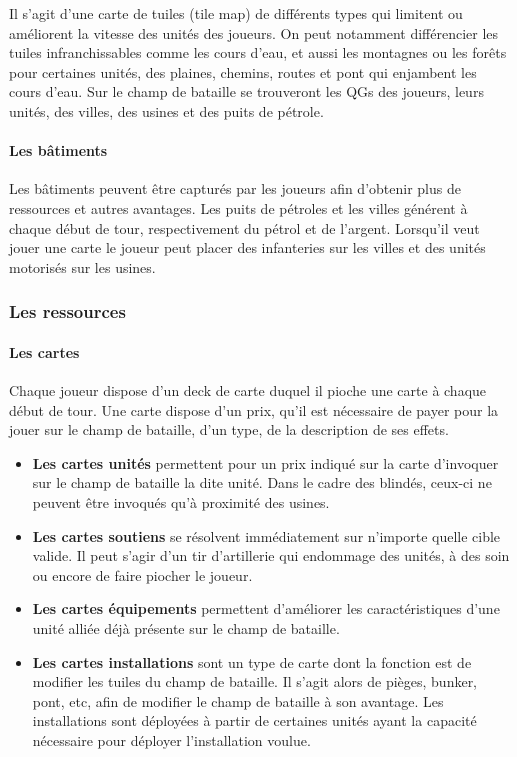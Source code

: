 Il s'agit d'une carte de tuiles (tile map) de différents types qui limitent ou améliorent la vitesse des unités des joueurs.
On peut notamment différencier les tuiles infranchissables comme les cours d'eau, et aussi les montagnes ou les forêts pour certaines unités, des plaines, chemins, routes et pont qui enjambent les cours d'eau.
Sur le champ de bataille se trouveront les QGs des joueurs, leurs unités, des villes, des usines et des puits de pétrole.



\paragraph{Les bâtiments}

Les bâtiments peuvent être capturés par les joueurs afin d'obtenir plus de ressources et autres avantages. Les puits de pétroles et les villes générent à chaque début de tour, respectivement du pétrol et de l'argent. Lorsqu'il veut jouer une carte le joueur peut placer des infanteries sur les villes et des unités motorisés sur les usines.



\subsubsection{Les ressources}

\paragraph{Les cartes}

Chaque joueur dispose d'un deck de carte duquel il pioche une carte à chaque début de tour. Une carte dispose d'un prix, qu'il est nécessaire de payer pour la jouer sur le champ de bataille, d'un type, de la description de ses effets. \n
\begin{itemize}
    \item \textbf{Les cartes unités} permettent pour un prix indiqué sur la carte d'invoquer sur le champ de bataille la dite unité. Dans le cadre des blindés, ceux-ci ne peuvent être invoqués qu'à proximité des usines.
    \item \textbf{Les cartes soutiens} se résolvent immédiatement sur n'importe quelle cible valide. Il peut s'agir d'un tir d'artillerie qui endommage des unités, à des soin ou encore de faire piocher le joueur.
    \item \textbf{Les cartes équipements} permettent d'améliorer les caractéristiques d'une unité alliée déjà présente sur le champ de bataille. 
    \item \textbf{Les cartes installations} sont un type de carte dont la fonction est de modifier les tuiles du champ de bataille. Il s'agit alors de pièges, bunker, pont, etc, afin de modifier le champ de bataille à son avantage. Les installations sont déployées à partir de certaines unités ayant la capacité nécessaire pour déployer l'installation voulue.

\end{itemize}


